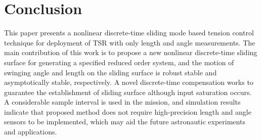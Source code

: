 \documentclass[10pt,final,journal]{IEEEtran}
\begin{document}
\section{Conclusion}
This paper presents a nonlinear discrete-time sliding mode based tension control technique for deployment of TSR with only length and angle measurements. The main contribution of this work is to propose a new nonlinear discrete-time sliding surface for generating a specified reduced order  system, and the motion of swinging angle and length on the sliding surface is robust stable and asymptotically stable, respectively. A novel discrete-time compensation works to guarantee the establishment of sliding surface although input saturation occurs. A considerable sample interval is used in the mission, and simulation results indicate that proposed method does not require high-precision length and angle sensors to be implemented, which may aid the future astronautic experiments and applications. 





%


\end{document}

